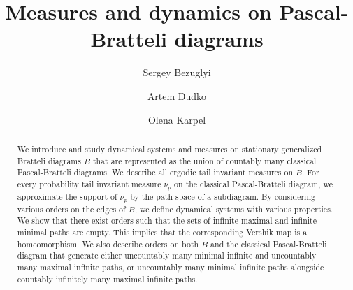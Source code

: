 \documentclass[11pt, twoside]{amsart}
\theoremstyle{definition}
\theoremstyle{remark}
\theoremstyle{plain}
\numberwithin{equation}{section}
\begin{document}
\title[Measures and dynamics on Pascal-Bratteli diagrams]{Measures and dynamics on Pascal-Bratteli diagrams}



\author{Sergey Bezuglyi}
\address{Department of Mathematics,
University of Iowa, Iowa City, IA 52242-1419
USA}

\author{Artem Dudko}
\address{Institute of Mathematics of the Polish Academy of Sciences, ul. \'Sniadeckich 8, 00-656 Warsaw, Poland \&
B. Verkin Institute for Low Temperature Physics and Engineering,
47~Nauky Ave., Kharkiv, 61103, Ukraine}


\author{Olena Karpel}
\address{AGH University of Krakow, Faculty of Applied Mathematics, al. Adama Mickiewicza~30, 30-059 Krakow, Poland \&
B. Verkin Institute for Low Temperature Physics and Engineering,
47~Nauky Ave., Kharkiv, 61103, Ukraine}





\begin{abstract}
We introduce and study dynamical systems and measures on stationary generalized Bratteli diagrams $B$ that are 
represented as the union of countably many classical 
Pascal-Bratteli diagrams. We describe all ergodic tail invariant measures on $B$. For every probability tail invariant measure $\nu_p$ on the classical Pascal-Bratteli diagram, we approximate 
the support 
of $\nu_p$ by the path space of a subdiagram. By considering various orders on the edges of $B$,
we define dynamical systems with various properties. 
We show that there exist orders such that the sets of infinite maximal and infinite minimal paths are empty. This implies that the corresponding Vershik map is a homeomorphism.
We also describe orders on both $B$ and the classical Pascal-Bratteli diagram that generate either uncountably many minimal infinite and uncountably many maximal infinite paths, or uncountably many minimal infinite paths alongside countably infinitely many maximal infinite paths.
 
\end{abstract}
\end{document}
